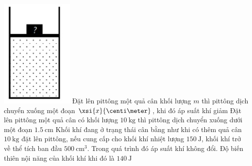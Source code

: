 \begin{ex}
	{\vspace{-0.75cm}\includegraphics[scale=0.7]{../figs/FINAL-SEM1-003-5}}
	{Đặt lên pittông một quả cân khối lượng $m$ thì pittông dịch chuyển xuống một đoạn $\xsi{x}{\centi\meter}$, khi đó áp suất khí giảm}
	{Đặt lên pittông một quả cân có khối lượng $\SI{10}{\kilogram}$ thì pittông dịch chuyển xuống dưới một đoạn $\SI{1.5}{\centi\meter}$}
	{\True Khối khí đang ở trạng thái cân bằng như khi có thêm quả cân $\SI{10}{\kilogram}$ đặt lên pittông, nếu cung cấp cho khối khí nhiệt lượng $\SI{150}{\joule}$, khối khí trở về thể tích ban đầu $\SI{500}{\centi\meter^3}$. Trong quá trình đó áp suất khí không đổi. Độ biến thiên nội năng của khối khí khi đó là $\SI{140}{\joule}$}
\end{ex}
